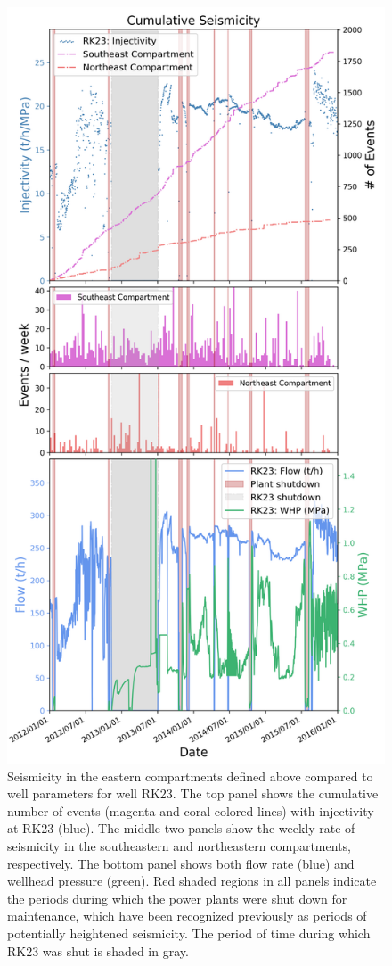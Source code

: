 \begin{figure}[h!]
\begin{center}
\includegraphics[width=0.56\columnwidth]{Chapter_4_Rot/figures/Rot_dets_GC_normalized_east_compartment_RK23_flow/Rot_dets_GC_four_panel_II-rate-WHP_east_compartment_RK23_original}
\caption{{Seismicity in the eastern compartments defined above compared to well
parameters for well RK23. The top panel shows the cumulative number of
events (magenta and coral colored lines) with injectivity at RK23
(blue). The middle two panels show the weekly rate of seismicity in the
southeastern and northeastern compartments, respectively. The bottom
panel shows both flow rate (blue) and wellhead pressure (green). Red
shaded regions in all panels indicate the periods during which the power
plants were shut down for maintenance, which have been recognized
previously as periods of potentially heightened seismicity. The period
of time during which RK23 was shut is shaded in gray.
{\label{102850}}%
}}
\end{center}
\end{figure}

